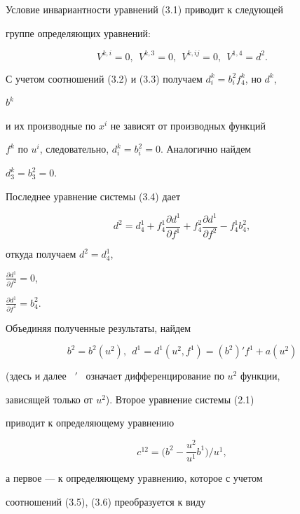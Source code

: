 Условие инвариантности уравнений (3.1) приводит к следующей 


группе определяющих уравнений: 


\begin{equation} 


V^{k,i}=0,\ \ V^{k,3}=0,\ \ V^{k,ij}=0,\ \ V^{1,4}=d^2. 


\end{equation} 


С учетом соотношений (3.2) и (3.3) получаем $d^k_i=b^2_if^k_4$, но $d^k$, 


$b^k$ 


и их производные по $x^i$ не зависят от производных функций 


$f^k$ по $u^i$, следовательно, $d^k_i=b^2_i=0$. Аналогично найдем 


$d^k_3=b^2_3=0$. 


Последнее уравнение системы (3.4) дает 


$$ 


d^2=d^1_4+f^1_4\frac{\partial d^1}{\partial f^1}+f^2_4 


\frac{\partial d^1}{\partial f^2}-f^1_4b^2_4, 


$$ 


откуда получаем $d^2=d^1_4$, 


$\frac{\partial d^1}{\partial f^2}=0$, 


$\frac{\partial d^1}{\partial f^1}=b^2_4$. 


Объединяя полученные результаты, найдем 


\begin{equation} 


b^2=b^2(u^2),\ \ d^1=d^1(u^2,f^1)=(b^2)' f^1+a(u^2) 


\end{equation} 


(здесь и далее \ ${}'$ \ означает дифференцирование по $u^2$ функции, 


зависящей только от $u^2$). Второе уравнение системы (2.1) 


приводит к определяющему уравнению 


\begin{equation} 


c^{12}=\bigg(b^2-\frac{u^2}{u^1}b^1\bigg)\Big/ u^1, 


\end{equation} 


а первое --- к определяющему уравнению, которое с учетом 


соотношений (3.5), (3.6) преобразуется к виду 


